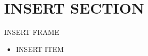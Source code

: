 \documentclass[12pt,xcolor=dvipsnames,usepdftitle=false]{beamer}
\begin{document}
\maketitle

\makeoutline

\section{INSERT SECTION}

\begin{frame}{INSERT FRAME}
\begin{itemize}
	\item INSERT ITEM
\end{itemize}
\end{frame}
\end{document}
